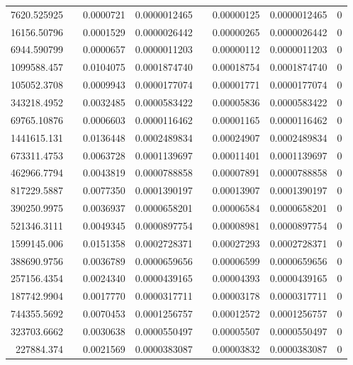 \documentclass[
journal=jacsat, %
manuscript=article]{achemso}
\begin{document}
\begin{table}[htbp]
{\begin{tabular}{rrrrrrrr}
    7620.525925 &       & 0.0000721 & 0.0000012465 &       & 0.00000125 & 0.0000012465 & 0 \\
    16156.50796 &       & 0.0001529 & 0.0000026442 &       & 0.00000265 & 0.0000026442 & 0 \\
    6944.590799 &       & 0.0000657 & 0.0000011203 &       & 0.00000112 & 0.0000011203 & 0 \\
    1099588.457 &       & 0.0104075 & 0.0001874740 &       & 0.00018754 & 0.0001874740 & 0 \\
    105052.3708 &       & 0.0009943 & 0.0000177074 &       & 0.00001771 & 0.0000177074 & 0 \\
    343218.4952 &       & 0.0032485 & 0.0000583422 &       & 0.00005836 & 0.0000583422 & 0 \\
    69765.10876 &       & 0.0006603 & 0.0000116462 &       & 0.00001165 & 0.0000116462 & 0 \\
    1441615.131 &       & 0.0136448 & 0.0002489834 &       & 0.00024907 & 0.0002489834 & 0 \\
    673311.4753 &       & 0.0063728 & 0.0001139697 &       & 0.00011401 & 0.0001139697 & 0 \\
    462966.7794 &       & 0.0043819 & 0.0000788858 &       & 0.00007891 & 0.0000788858 & 0 \\
    817229.5887 &       & 0.0077350 & 0.0001390197 &       & 0.00013907 & 0.0001390197 & 0 \\
    390250.9975 &       & 0.0036937 & 0.0000658201 &       & 0.00006584 & 0.0000658201 & 0 \\
    521346.3111 &       & 0.0049345 & 0.0000897754 &       & 0.00008981 & 0.0000897754 & 0 \\
    1599145.006 &       & 0.0151358 & 0.0002728371 &       & 0.00027293 & 0.0002728371 & 0 \\
    388690.9756 &       & 0.0036789 & 0.0000659656 &       & 0.00006599 & 0.0000659656 & 0 \\
    257156.4354 &       & 0.0024340 & 0.0000439165 &       & 0.00004393 & 0.0000439165 & 0 \\
    187742.9904 &       & 0.0017770 & 0.0000317711 &       & 0.00003178 & 0.0000317711 & 0 \\
    744355.5692 &       & 0.0070453 & 0.0001256757 &       & 0.00012572 & 0.0001256757 & 0 \\
    323703.6662 &       & 0.0030638 & 0.0000550497 &       & 0.00005507 & 0.0000550497 & 0 \\
    227884.374 &       & 0.0021569 & 0.0000383087 &       & 0.00003832 & 0.0000383087 & 0 \\

\end{tabular}}
\end{table}
\end{document}
